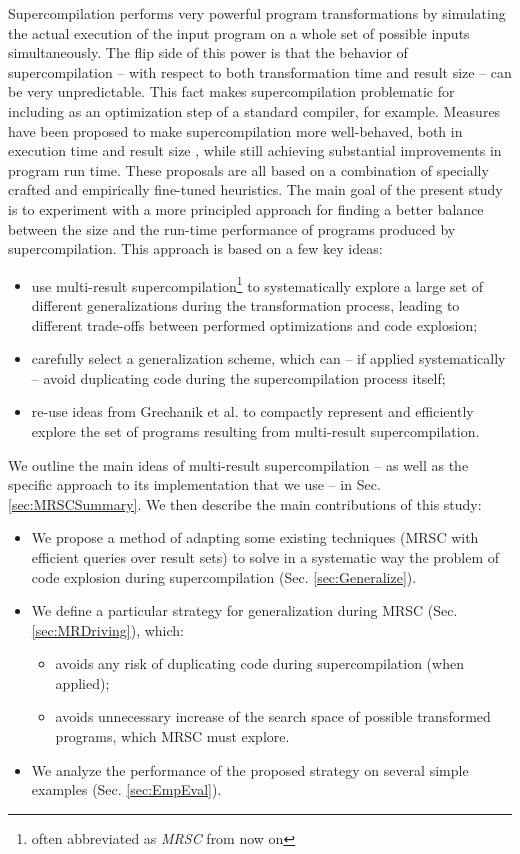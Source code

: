 \documentclass[submission,copyright,creativecommons]{eptcs}
\begin{document}
Supercompilation performs very powerful program transformations by simulating
the actual execution of the input program on a whole set of possible inputs
simultaneously.
The flip side of this power is that the behavior of supercompilation -- 
with respect to both transformation time and result size --
can be very unpredictable.
This fact makes supercompilation problematic for including as an
optimization step of a standard compiler, for example.
Measures have been proposed to make supercompilation more
well-behaved, both in execution time and result size \cite{bolingbroke2011improving,Jonsson2011Taming},
while still achieving substantial improvements in program run time.
These proposals are all based on a combination of specially crafted and
empirically fine-tuned heuristics.
The main goal of the present study is to experiment with a more
principled approach for finding a better balance between the size and the
run-time performance of programs produced by supercompilation.
This approach is based on a few key ideas:
\begin{itemize}
  \item use multi-result supercompilation\footnote{often abbreviated as \emph{MRSC} from now on} 
    \cite{KlyuchnikovMRSCBranch,Klyuchnikov:META2012:MRSC,Romanenko2014StagedMRSC}
    to systematically explore a large set of different generalizations during 
    the transformation process, 
    leading to different trade-offs between performed optimizations and code explosion;
  \item carefully select a generalization scheme, which can -- if applied systematically -- avoid duplicating
    code during the supercompilation process itself;
  \item re-use ideas from Grechanik et al. \cite{Romanenko2014StagedMRSC} to compactly represent and efficiently
    explore the set of programs resulting from multi-result supercompilation.
\end{itemize}
We outline the main ideas of multi-result supercompilation --
as well as the specific approach to its implementation that we use --
in Sec. \ref{sec:MRSCSummary}. We then describe the main contributions of this study:
\begin{itemize}
  \item We propose a method of adapting some existing techniques (MRSC with
    efficient queries over result sets)
    to solve in a systematic way the problem of code explosion during supercompilation (Sec. \ref{sec:Generalize}).
  \item We define a particular strategy for generalization during MRSC (Sec. \ref{sec:MRDriving}), which:
    \begin{itemize}
      \item avoids any risk of duplicating code during supercompilation (when applied);
      \item avoids unnecessary increase of the search space of possible
        transformed programs, which MRSC must explore.
    \end{itemize}
  \item We analyze the performance of the proposed strategy on several
    simple examples (Sec. \ref{sec:EmpEval}).
\end{itemize}
\end{document}
